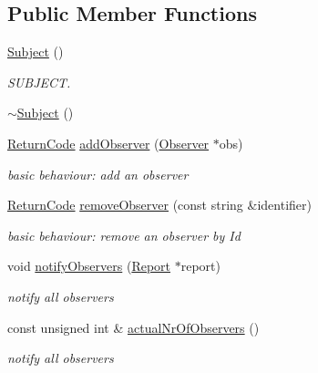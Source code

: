 \subsection*{Public Member Functions}
\begin{DoxyCompactItemize}
\item 
\hyperlink{classit_1_1testbench_1_1data_1_1Subject_a71340cc0d556f600ae754c79704c49fe}{Subject} ()
\begin{DoxyCompactList}\small\item\em S\-U\-B\-J\-E\-C\-T. \end{DoxyCompactList}\item 
\hyperlink{classit_1_1testbench_1_1data_1_1Subject_a8f5761379c56c57fcded140bfd795535}{$\sim$\-Subject} ()
\item 
\hyperlink{structit_1_1testbench_1_1data_1_1ReturnCode}{Return\-Code} \hyperlink{classit_1_1testbench_1_1data_1_1Subject_aed20252fb082edec1b278dbc4f5b9bc0}{add\-Observer} (\hyperlink{classit_1_1testbench_1_1data_1_1Observer}{Observer} $\ast$obs)
\begin{DoxyCompactList}\small\item\em basic behaviour\-: add an observer \end{DoxyCompactList}\item 
\hyperlink{structit_1_1testbench_1_1data_1_1ReturnCode}{Return\-Code} \hyperlink{classit_1_1testbench_1_1data_1_1Subject_aa2709fa7a534baab9515118e2735bd6d}{remove\-Observer} (const string \&identifier)
\begin{DoxyCompactList}\small\item\em basic behaviour\-: remove an observer by Id \end{DoxyCompactList}\item 
void \hyperlink{classit_1_1testbench_1_1data_1_1Subject_a207cb996752bcf4af2d9ed721d85f07c}{notify\-Observers} (\hyperlink{classit_1_1testbench_1_1data_1_1Report}{Report} $\ast$report)
\begin{DoxyCompactList}\small\item\em notify all observers \end{DoxyCompactList}\item 
const unsigned int \& \hyperlink{classit_1_1testbench_1_1data_1_1Subject_a98644ffd18ffb564a3459cd050114bef}{actual\-Nr\-Of\-Observers} ()
\begin{DoxyCompactList}\small\item\em notify all observers \end{DoxyCompactList}\end{DoxyCompactItemize}
